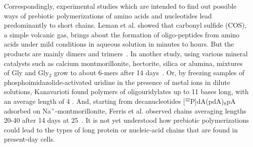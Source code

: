 \documentclass[journal=jacsat,manuscript=article,layout=twocolumn]{achemso}
\begin{document}
Correspondingly, experimental studies which are intended to find out possible ways of prebiotic 
polymerizations of amino acids and nucleotides lead predominantly to short chains. Leman et al. 
showed that carbonyl sulfide (COS), a simple volcanic gas, brings about the formation of 
oligo-peptides from amino acids under mild conditions in aqueous solution in minutes to hours. But
the products are mainly dimers and trimers~\cite{Leman2004a}.  In another study, using various 
mineral 
catalysts such as calcium montmorillonite, hectorite, silica or alumina, mixtures of Gly and 
Gly$_2$ 
grow to about 6-mers after 14 days~\cite{Rode1997,Rode1999}.  Or, by freezing samples of 
phosphoimidazolide-activated uridine in the presence of metal ions in dilute solutions, Kanavarioti 
found polymers of oligouridylates up to 11 bases long, with an average length of 4 
\cite{Kanavarioti2001}.  And, starting from decanucleotides [$^{32}$P]dA(pdA)$_8$pA adsorbed on 
Na$^+$-montmorillonite, Ferris et al. observed chains averaging lengths 20-40 after 14 days at 
25\textcelsius\ \cite{Ferris1996}.  It is not yet understood how prebiotic polymerizations could 
lead to the types of long protein or nucleic-acid chains that are found in present-day cells.
\end{document}
